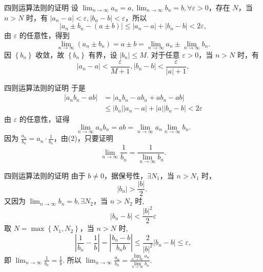 \documentclass[mathserif]{beamer}
\begin{document}
\begin{frame}[label=szyszm]{四则运算法则的证明\hfill\hyperlink{szys<1>}{}}
	\suojin \zheng {} 设 $\lim _{n \rightarrow \infty} a_n=a, \lim _{n \rightarrow \infty} b_n=b, \forall \varepsilon>0$，存在 $N$，当 $n>N$ 时，有 $\left|a_n-a\right|<\varepsilon,\left|b_n-b\right|<\varepsilon$，所以
	$$
	\left|a_n \pm b_n-(a \pm b)\right| \leq\left|a_n-a\right|+\left|b_n-b\right|<2 \varepsilon,
	$$
	由 $\varepsilon$ 的任意性，得到
	$$
	\lim _{n \rightarrow \infty}\left(a_n \pm b_n\right)=a \pm b=\lim _{n \rightarrow \infty} a_n \pm \lim _{n \rightarrow \infty} b_n .
	$$
	\suojin {}  因 $\left\{b_n\right\}$ 收敛，故 $\left\{b_n\right\}$ 有界，设 $\left|b_n\right| \leq M$.
	对于任意 $\varepsilon>0$，当 $n>N$ 时，有
	$$
	\left|a_n-a\right|<\frac{\varepsilon}{M+1},\left|b_n-b\right|<\frac{\varepsilon}{|a|+1},
	$$
	
\end{frame}


\begin{frame}{四则运算法则的证明\hfill\hyperlink{szys<1>}{}}%
	于是
	$$
	\begin{aligned}
		\left|a_n b_n-a b\right| & =\left|a_n b_n-a b_n+a b_n-a b\right| \\
		& \leq\left|b_n\right|\left|a_n-a\right|+|a|\left|b_n-b\right|<2 \varepsilon
	\end{aligned}
	$$
	由 $\varepsilon$ 的任意性，证得
	$$
	\lim _{n \rightarrow \infty} a_n b_n=a b=\lim _{n \rightarrow \infty} a_n \lim _{n \rightarrow \infty} b_n .
	$$
	\suojin  {} 因为 $\frac{a_n}{b_n}=a_n \cdot \frac{1}{b_n}$，由(2)，只要证明
	$$
	\lim _{n \rightarrow \infty} \frac{1}{b_n}=\frac{1}{\lim\limits_{n \rightarrow \infty} b_n} .
	$$
\end{frame}


\begin{frame}{四则运算法则的证明\hfill\hyperlink{szys<1>}{}}%
	\suojin 由于 $b \neq 0$，据保号性，$\exists N_1$，当 $n>N_1$ 时， 
	$$
	\left|b_n\right|>\frac{|b|}{2} \text {. }
	$$
	又因为 $\lim _{n \rightarrow \infty} b_n=b, \exists N_2$，当 $n>N_2$ 时,
	$$
	\left|b_n-b\right|<\frac{|b|^2}{2} \varepsilon
	$$
	取 $N=\max \left\{N_1, N_2\right\}$，当 $n>N$ 时,
	$$
	\left|\frac{1}{b_n}-\frac{1}{b}\right|=\left|\frac{b_n-b}{b_n b}\right| \leq \frac{2}{|b|^2}\left|b_n-b\right| \leq \varepsilon,
	$$
	即 $\lim _{n \rightarrow \infty} \frac{1}{b_n}=\frac{1}{b}$. 所以 $\lim _{n \rightarrow \infty} \frac{a_n}{b_n}=\frac{\lim \limits_{n \rightarrow \infty} a_n}{\lim \limits_{n \rightarrow \infty} b_n}$.   
\end{frame}
\end{document}

